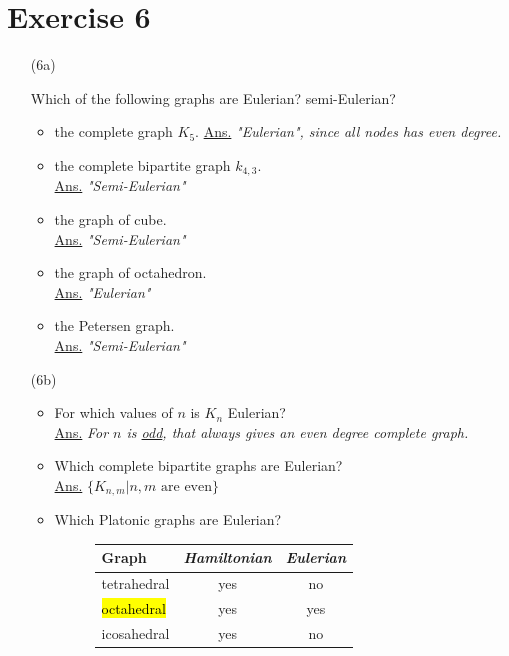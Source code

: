 \documentclass[12pt,a4paper, twocolumn]{article}
\begin{document}
\section*{Exercise 6}
\begin{itemize}
		\item[(6a)] {\color{blue} Which of the following graphs are Eulerian? semi-Eulerian?
				\begin{itemize}
						\item the complete graph $K_5$. {\color{black} \underline{Ans.} \textit{"Eulerian", since all nodes has even degree.}}
						\item the complete bipartite graph $k_{4,3}$. \\ {\color{black} \underline{Ans.} \textit{ "Semi-Eulerian"}}
						\item the graph of cube. \\ {\color{black} \underline{Ans.} \textit{"Semi-Eulerian"}}
						\item the graph of octahedron.\\ {\color{black} \underline{Ans.} \textit{ "Eulerian"}}
						\item the Petersen graph. \\ {\color{black} \underline{Ans.} \textit{"Semi-Eulerian"}}
				\end{itemize}
				}
			\hsplit
		\item[(6b)] {\color{blue} 			
				\begin{itemize}
						\item For which values of $n$ is $K_n$ Eulerian?  \\ {\color{black} \underline{Ans.} \textit{ For $n$ is \underline{odd}, that always gives an even degree complete graph.}}
						\item Which complete bipartite graphs are Eulerian?  \\ {\color{black} \underline{Ans.} \textit{$ \{K_{n,m} \vert n,m \text{ are even}  \} $}}
						\item Which Platonic graphs are Eulerian?  \\ {\color{black}
						\begin{figure}[h!]
						\centering
						\begin{tabular}{l|cc}
						Graph & \emph{Hamiltonian} & \emph{Eulerian} \\
						\hline
						tetrahedral & yes & no\\
						\hl{octahedral} & yes & yes\\
						icosahedral & yes & no\\

\end{tabular}
\end{figure}}
\end{itemize}}
\end{itemize}
\end{document}
